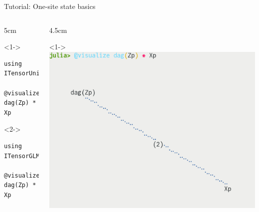 \begin{frame}[fragile]{Tutorial: One-site state basics}

\begin{columns}

\begin{column}{5cm}

\begin{onlyenv}<1->
\vspace*{-1.0cm}
\begin{lstlisting}[language=JuliaLocal, style=julia, basicstyle=\small]
using ITensorUnicodePlots

@visualize dag(Zp) * Xp
\end{lstlisting}

\end{onlyenv}

\begin{onlyenv}<2->
\vspace*{1.5cm}
\begin{lstlisting}[language=JuliaLocal, style=julia, basicstyle=\small]
using ITensorGLMakie

@visualize dag(Zp) * Xp
\end{lstlisting}

\end{onlyenv}

\end{column}

\begin{column}{4.5cm}

\begin{onlyenv}<1->
\includegraphics[width=1.0\textwidth]{
  slides/assets/ZpXp_unicode.png
}
\end{onlyenv}


\end{column}
\end{columns}
\end{frame}
